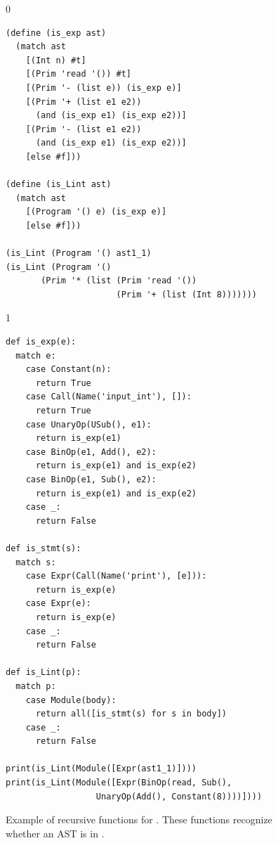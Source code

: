 \documentclass[7x10]{TimesAPriori_MIT}%
\def\racketEd{0}
\def\pythonEd{1}
\def\edition{1}
\newcommand{\pythonColor}[0]{}
\numberwithin{theorem}{chapter}
\numberwithin{definition}{chapter}
\numberwithin{equation}{chapter}
\begin{document}
\begin{figure}[tp]
\begin{tcolorbox}[colback=white]
{\if\edition\racketEd
\begin{lstlisting}
(define (is_exp ast)
  (match ast
    [(Int n) #t]
    [(Prim 'read '()) #t]
    [(Prim '- (list e)) (is_exp e)]
    [(Prim '+ (list e1 e2))
      (and (is_exp e1) (is_exp e2))]
    [(Prim '- (list e1 e2))
      (and (is_exp e1) (is_exp e2))]
    [else #f]))

(define (is_Lint ast)
  (match ast
    [(Program '() e) (is_exp e)]
    [else #f]))

(is_Lint (Program '() ast1_1)
(is_Lint (Program '()
       (Prim '* (list (Prim 'read '())
                      (Prim '+ (list (Int 8)))))))
\end{lstlisting}
\fi}
{\if\edition\pythonEd\pythonColor
\begin{lstlisting}
def is_exp(e):
  match e:
    case Constant(n):
      return True
    case Call(Name('input_int'), []):
      return True
    case UnaryOp(USub(), e1):
      return is_exp(e1)
    case BinOp(e1, Add(), e2):
      return is_exp(e1) and is_exp(e2)
    case BinOp(e1, Sub(), e2):
      return is_exp(e1) and is_exp(e2)
    case _:
      return False

def is_stmt(s):
  match s:
    case Expr(Call(Name('print'), [e])):
      return is_exp(e)
    case Expr(e):
      return is_exp(e)
    case _:
      return False
  
def is_Lint(p):
  match p:
    case Module(body):
      return all([is_stmt(s) for s in body])
    case _:
      return False

print(is_Lint(Module([Expr(ast1_1)])))
print(is_Lint(Module([Expr(BinOp(read, Sub(),
                  UnaryOp(Add(), Constant(8))))])))
\end{lstlisting}
\fi}
\end{tcolorbox}
\caption{Example of recursive functions for \LangInt{}. These functions
  recognize whether an AST is in \LangInt{}.}
\label{fig:exp-predicate}
\end{figure}


\end{document}

